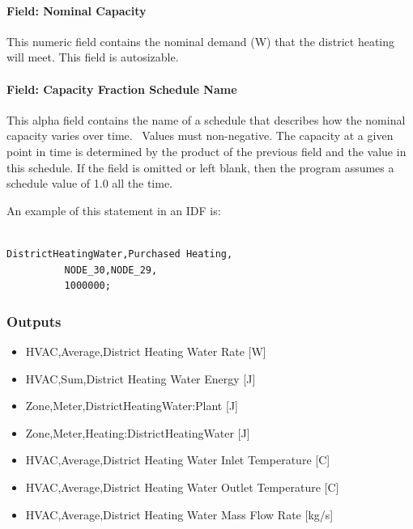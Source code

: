 \paragraph{Field: Nominal Capacity}\label{field-nominal-capacity-11}

This numeric field contains the nominal demand (W) that the district heating will meet. This field is autosizable.

\paragraph{Field: Capacity Fraction Schedule Name}\label{field-capacity-fraction-schedule-name-1}

This alpha field contains the name of a schedule that describes how the nominal capacity varies over time.~ Values must non-negative. The capacity at a given point in time is determined by the product of the previous field and the value in this schedule. If the field is omitted or left blank, then the program assumes a schedule value of 1.0 all the time.

An example of this statement in an IDF is:

\begin{lstlisting}

DistrictHeatingWater,Purchased Heating,
          NODE_30,NODE_29,
          1000000;
\end{lstlisting}

\subsubsection{Outputs}\label{outputs-15-002}

\begin{itemize}
    \item
    HVAC,Average,District Heating Water Rate {[}W{]}
    \item
    HVAC,Sum,District Heating Water Energy {[}J{]}
    \item
    Zone,Meter,DistrictHeatingWater:Plant {[}J{]}
    \item
    Zone,Meter,Heating:DistrictHeatingWater {[}J{]}
    \item
    HVAC,Average,District Heating Water Inlet Temperature {[}C{]}
    \item
    HVAC,Average,District Heating Water Outlet Temperature {[}C{]}
    \item
    HVAC,Average,District Heating Water Mass Flow Rate {[}kg/s{]}
\end{itemize}

